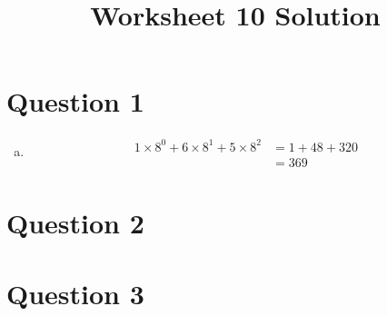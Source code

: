 \documentclass[12pt]{article}
\begin{document}
\title{Worksheet 10 Solution}
\maketitle

\section*{Question 1}
\begin{enumerate}[a.]
    \item

    \begin{align}
        1 \times 8^0 + 6 \times 8^1 + 5 \times 8^2 &= 1 + 48 + 320\\
        &= 369
    \end{align}
\end{enumerate}

\section*{Question 2}

\section*{Question 3}
\end{document}
